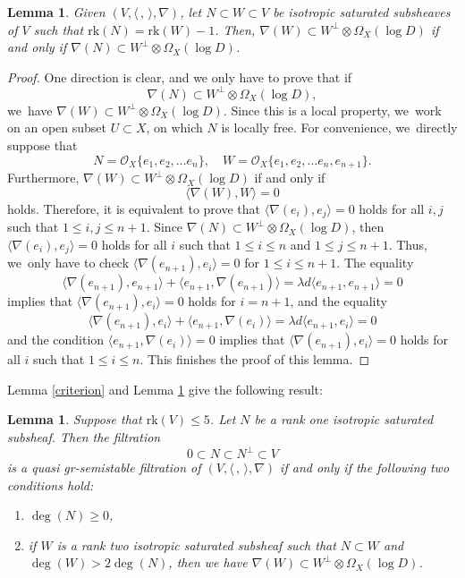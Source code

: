\documentclass[JEP,XML,SOM,Unicode,published]{cedram}
\newcommand{\grsemistable}{gr\nobreakdash-semi\-stable\xspace}
\newcommand{\rk}{\mathrm{rk}}
\theoremstyle{plain}
\newtheorem{lem}[thm]{Lemma}
\theoremstyle{definition}
\begin{document}
\begin{lem}\label{cork1}
Given $(V,\langle \,, \, \rangle,\nabla)$, let $N \subset W \subset V$ be isotropic saturated subsheaves of $V$ such that $\rk(N)=\rk(W)-1$. Then, $\nabla(W)\subset W^\perp\otimes \Omega_X(\log D)$ if and only if $\nabla(N)\subset W^\perp\otimes \Omega_X(\log D)$.
\end{lem}
\begin{proof}
One direction is clear, and we only have to prove that if
\[
\nabla(N)\subset W^\perp\otimes \Omega_X(\log D),
\]
we~have $\nabla(W)\subset W^\perp\otimes \Omega_X(\log D)$. Since this is a local property, we~work on an open subset $U \subset X$, on which $N$ is locally free. For convenience, we~directly suppose that
\[
N=\mathcal{O}_X\{e_1, e_2,\dots e_n\},\quad W=\mathcal{O}_X\{e_1, e_2,\dots e_n, e_{n+1}\}.
\]
Furthermore, $\nabla(W)\subset W^\perp\otimes \Omega_X(\log D)$ if and only if
\[
\langle \nabla(W),W \rangle=0
\]
holds. Therefore, it is equivalent to prove that $\langle \nabla(e_i), e_j \rangle=0$ holds for all $i,j$ such that $1\leq i,j\leq n+1$. Since $\nabla(N)\subset W^\perp\otimes \Omega_X(\log D)$, then $\langle \nabla(e_i), e_j \rangle=0$ holds for all $i$ such that $1\leq i\leq n$ and $1\leq j\leq n+1$. Thus, we~only have to check $\langle \nabla(e_{n+1}), e_i \rangle=0$ for $1\leq i\leq n+1$. The equality
\[
\langle \nabla(e_{n+1}), e_{n+1} \rangle+\langle e_{n+1}, \nabla(e_{n+1}) \rangle=\lambda d\langle e_{n+1},e_{n+1} \rangle=0
\]
implies that $\langle \nabla(e_{n+1}), e_i \rangle=0$ holds for $i= n+1$, and the equality
\[
\langle \nabla(e_{n+1}), e_i \rangle+\langle e_{n+1}, \nabla(e_i) \rangle=\lambda d\langle e_{n+1},e_i \rangle=0
\]
and the condition $\langle e_{n+1}, \nabla(e_i) \rangle=0$ implies that $\langle \nabla(e_{n+1}), e_i \rangle=0$ holds for all $i$ such that $1\leq i\leq n$. This finishes the proof of this lemma.
\end{proof}

Lemma \ref{criterion} and Lemma \ref{cork1} give the following result:
\begin{lem}\label{criterionrk5}
Suppose that $\rk(V) \leq 5$. Let $N$ be a rank one isotropic saturated subsheaf. Then the filtration
\[
0\subset N\subset N^\perp\subset V
\]
is a quasi \grsemistable filtration of $(V, \langle \,, \, \rangle, \nabla)$ if and only if the following two conditions hold:
\begin{enumerate}
\item $\deg(N)\geq 0$,

\item if $W$ is a rank two isotropic saturated subsheaf such that $N \subset W$ and $\deg(W)>2\deg(N)$, then we have $\nabla(W)\subset W^\perp\otimes \Omega_X(\log D)$.
\end{enumerate}
\end{lem}
\end{document}
